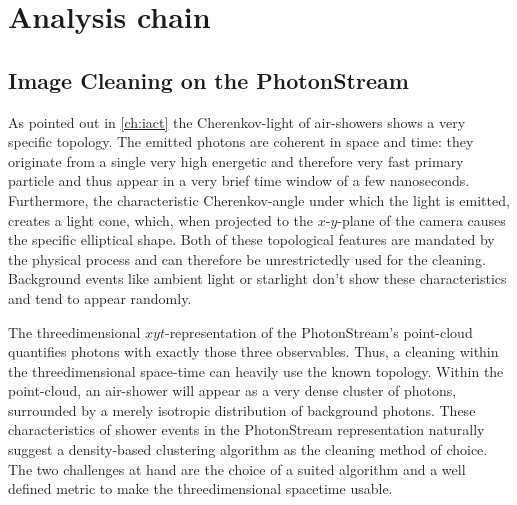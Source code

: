 \chapter{Analysis chain}
%

\section{Image Cleaning on the PhotonStream}
%
As pointed out in \autoref{ch:iact} the Cherenkov-light of air-showers shows a
very specific topology. The emitted photons are coherent in space and time:
they originate from a single very high energetic and therefore very fast
primary particle and thus appear in a very brief time window of a few
nanoseconds. Furthermore, the characteristic Cherenkov-angle under which the
light is emitted, creates a light cone, which, when projected to the
$x$-$y$-plane of the camera causes the specific elliptical shape. Both of these
topological features are mandated by the physical process and can therefore be
unrestrictedly used for the cleaning. Background events like ambient light or
starlight don't show these characteristics and tend to appear randomly.

The threedimensional $xyt$-representation of the PhotonStream's point-cloud
quantifies photons with exactly those three observables. Thus, a cleaning
within the threedimensional space-time can heavily use the known topology.
Within the point-cloud, an air-shower will appear as a very dense cluster of
photons, surrounded by a merely isotropic distribution of background photons.
These characteristics of shower events in the PhotonStream representation
naturally suggest a density-based clustering algorithm as the cleaning method
of choice. The two challenges at hand are the choice of a suited algorithm and
a well defined metric to make the threedimensional spacetime usable.

